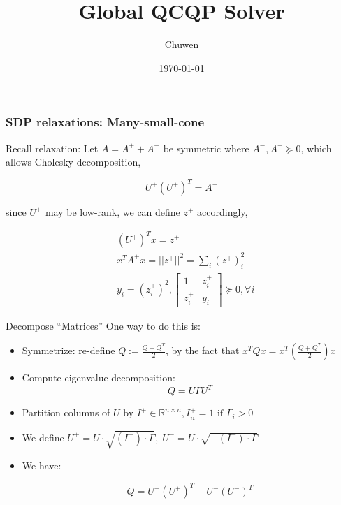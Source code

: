 
\usepackage{subfig}
\usepackage[style=verbose]{biblatex}
\title{Global QCQP Solver}
\author{Chuwen}
\date{\today}




\fontsize{10pt}{11.2}\selectfont
\frame{\titlepage}



\begin{frame}
  \frametitle{SDP relaxations: Many-small-cone}
  Recall relaxation:
  Let \(A = A^+ + A^-\) be symmetric where \(A^-, A^+ \succeq 0\), which allows Cholesky decomposition,

  \[U^+ (U^+)^T = A^+\]

  since $U^+$ may be low-rank, we can define $z^+$ accordingly,

  \begin{equation}
    \begin{aligned}
       & (U^+)^T x = z^+                                                 \\
       & x^TA^+ x = ||z^+||^2 = \sum_i (z^+)_i^2                         \\
       & y_i = (z^+_i)^2, \begin{bmatrix} 1 & z^+_i \\ z^+_i & y_i \end{bmatrix} \succeq 0, \forall i
    \end{aligned}
  \end{equation}
\end{frame}

\begin{frame}{Decompose ``Matrices''}
  One way to do this is:
  \begin{itemize}

    \item Symmetrize: re-define \(Q := \frac{Q + Q^T}{2}\), by the fact that \(x^TQx = x^T(\frac{Q + Q^T}{2})x\)

    \item Compute eigenvalue decomposition:
          \[Q = U\Gamma U^T\]
    \item Partition columns of \(U\) by
          \(I^+ \in \mathbb{R}^{n\times n}, I^+_{ii} = 1 \textrm{  if  }\Gamma_i > 0\)

    \item We define \(U^+ = U\cdot \sqrt{(I^+)\cdot\Gamma},\; U^- = U \cdot\sqrt{-(I^-)\cdot\Gamma}\)
    \item We have:

          \[Q =  U^+ (U^+)^T - U^- (U^-)^T\]
  \end{itemize}
\end{frame}

